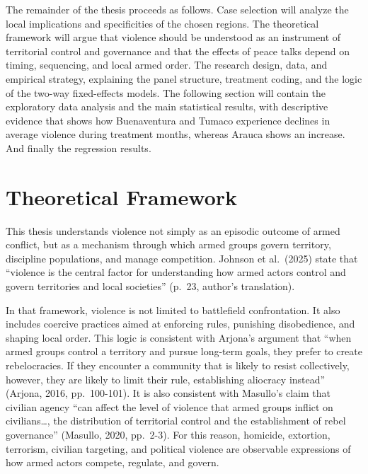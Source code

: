 \documentclass[11pt]{article}
\begin{document}
The remainder of the thesis proceeds as follows. Case selection will analyze the local implications and specificities of the chosen regions. The theoretical framework will argue that violence should be understood as an instrument of territorial control and governance and that the effects of peace talks depend on timing, sequencing, and local armed order. The research design, data, and empirical strategy, explaining the panel structure, treatment coding, and the logic of the two-way fixed-effects models. The following section will contain the exploratory data analysis and the main statistical results, with descriptive evidence that shows how Buenaventura and Tumaco experience declines in average violence during treatment months, whereas Arauca shows an increase. And finally the regression results.

\section{Theoretical Framework}\label{theoretical-framework}

This thesis understands violence not simply as an episodic outcome of armed conflict, but as a mechanism through which armed groups govern territory, discipline populations, and manage competition. Johnson et al.~(2025) state that ``violence is the central factor for understanding how armed actors control and govern territories and local societies'' (p.~23, author's translation). 

In that framework, violence is not limited to battlefield confrontation. It also includes coercive practices aimed at enforcing rules, punishing disobedience, and shaping local order. This logic is consistent with Arjona's argument that ``when armed groups control a territory and pursue long-term goals, they prefer to create rebelocracies. If they encounter a community that is likely to resist collectively, however, they are likely to limit their rule, establishing aliocracy instead'' (Arjona, 2016, pp.~100-101). It is also consistent with Masullo's claim that civilian agency ``can affect the level of violence that armed groups inflict on civilians\ldots, the distribution of territorial control and the establishment of rebel governance'' (Masullo, 2020, pp.~2-3). For this reason, homicide, extortion, terrorism, civilian targeting, and political violence are observable expressions of how armed actors compete, regulate, and govern.
\end{document}
